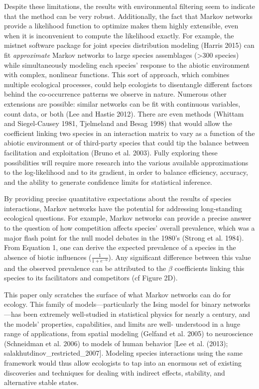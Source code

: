 \documentclass[12pt,]{article}
\begin{document}
\begin{spacing}{1.9}
\begin{flushleft}
Despite these limitations, the results with environmental filtering seem
to indicate that the method can be very robust. Additionally, the fact
that Markov networks provide a likelihood function to optimize makes
them highly extensible, even when it is inconvenient to compute the
likelihood exactly. For example, the mistnet software package for joint
species distribution modeling (Harris 2015) can fit \emph{approximate}
Markov networks to large species assemblages (\textgreater{}300 species)
while simultaneously modeling each species' response to the abiotic
environment with complex, nonlinear functions. This sort of approach,
which combines multiple ecological processes, could help ecologists to
disentangle different factors behind the co-occurrence patterns we
observe in nature. Numerous other extensions are possible: similar
networks can be fit with continuous variables, count data, or both (Lee
and Hastie 2012). There are even methods (Whittam and Siegel-Causey
1981, Tjelmeland and Besag 1998) that would allow the coefficient
linking two species in an interaction matrix to vary as a function of
the abiotic environment or of third-party species that could tip the
balance between facilitation and exploitation (Bruno et al. 2003). Fully
exploring these possibilities will require more research into the
various available approximations to the log-likelihood and to its
gradient, in order to balance efficiency, accuracy, and the ability to
generate confidence limits for statistical inference.

By providing precise quantitative expectations about the results of
species interactions, Markov networks have the potential for addressing
long-standing ecological questions. For example, Markov networks can
provide a precise answer to the question of how competition affects
species' overall prevalence, which was a major flash point for the null
model debates in the 1980's (Strong et al. 1984). From Equation 1, one
can derive the expected prevalence of a species in the absence of biotic
influences (\(\frac{1}{1 + e^{-\alpha}}\)). Any significant difference
between this value and the observed prevalence can be attributed to the
\(\beta\) coefficients linking this species to its facilitators and
competitors (cf Figure 2D).

This paper only scratches the surface of what Markov networks can do for
ecology. This family of models---particularly the Ising model for binary
networks---has been extremely well-studied in statistical physics for
nearly a century, and the models' properties, capabilities, and limits
are well- understood in a huge range of applications, from spatial
modeling (Gelfand et al. 2005) to neuroscience (Schneidman et al. 2006)
to models of human behavior {[}Lee et al. (2013);
salakhutdinov\_restricted\_2007{]}. Modeling species interactions using
the same framework would thus allow ecologists to tap into an enormous
set of existing discoveries and techniques for dealing with indirect
effects, stability, and alternative stable states.


\end{flushleft}
\end{spacing}
\end{document}
